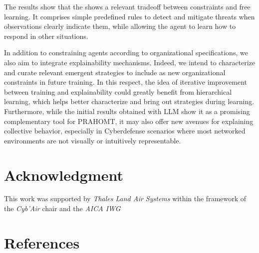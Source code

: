 \documentclass[conference]{IEEEtran}
\begin{document}
The results show that the  shows a relevant tradeoff between constraints and free learning. It comprises simple predefined rules to detect and mitigate threats when observations clearly indicate them, while allowing the agent to learn how to respond in other situations.

In addition to constraining agents according to organizational specifications, we also aim to integrate explainability mechanisms. Indeed, we intend to characterize and curate relevant emergent strategies to include as new organizational constraints in future training. In this respect, the idea of iterative improvement between training and explainability could greatly benefit from hierarchical learning, which helps better characterize and bring out strategies during learning. Furthermore, while the initial results obtained with LLM show it as a promising complementary tool for PRAHOMT, it may also offer new avenues for explaining collective behavior, especially in Cyberdefense scenarios where most networked environments are not visually or intuitively representable.




\section*{Acknowledgment}

This work was supported by \emph{Thales Land Air Systems} within the framework of the \emph{Cyb'Air} chair and the \emph{AICA IWG}

\section*{References}

% 



\end{document}
